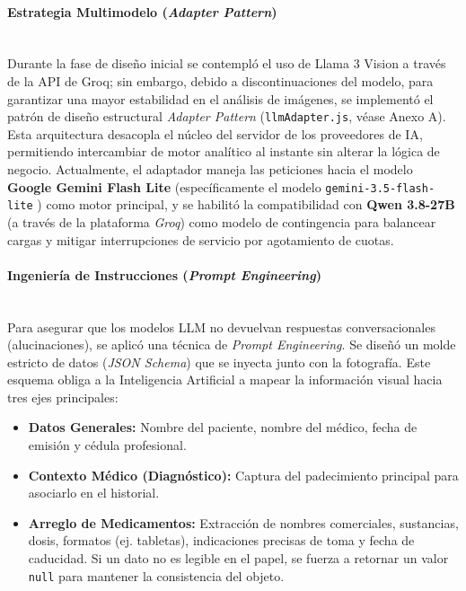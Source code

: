 \paragraph{Estrategia Multimodelo (\emph{Adapter Pattern})}\leavevmode \\
Durante la fase de diseño inicial se contempló el uso de Llama 3 Vision a través de la API de Groq; sin embargo, debido a discontinuaciones del modelo, para garantizar una mayor estabilidad en el análisis de imágenes, se implementó el patrón de diseño estructural \emph{Adapter Pattern} (\texttt{llmAdapter.js}, véase Anexo A). Esta arquitectura desacopla el núcleo del servidor de los proveedores de IA, permitiendo intercambiar de motor analítico al instante sin alterar la lógica de negocio. Actualmente, el adaptador maneja las peticiones hacia el modelo \textbf{Google Gemini Flash Lite} \cite{geminiapi} (específicamente el modelo \texttt{gemini-3.5-flash-lite} \cite{geminimodelo}) como motor principal, y se habilitó la compatibilidad con \textbf{Qwen 3.8-27B} \cite{groqdocs2026qwen} (a través de la plataforma \emph{Groq}) como modelo de contingencia para balancear cargas y mitigar interrupciones de servicio por agotamiento de cuotas. 

\paragraph{Ingeniería de Instrucciones (\emph{Prompt Engineering})} \leavevmode \\
Para asegurar que los modelos LLM no devuelvan respuestas conversacionales (alucinaciones), se aplicó una técnica de \emph{Prompt Engineering}. Se diseñó un molde estricto de datos (\emph{JSON Schema}) que se inyecta junto con la fotografía. Este esquema obliga a la Inteligencia Artificial a mapear la información visual hacia tres ejes principales:

\begin{itemize}
    \item \textbf{Datos Generales:} Nombre del paciente, nombre del médico, fecha de emisión y cédula profesional.
    \item \textbf{Contexto Médico (Diagnóstico):} Captura del padecimiento principal para asociarlo en el historial.
    \item \textbf{Arreglo de Medicamentos:} Extracción de nombres comerciales, sustancias, dosis, formatos (ej. tabletas), indicaciones precisas de toma y fecha de caducidad. Si un dato no es legible en el papel, se fuerza a retornar un valor \texttt{null} para mantener la consistencia del objeto.
\end{itemize}

